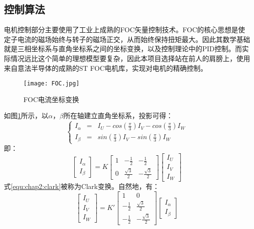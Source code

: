 \subsection{控制算法}
电机控制部分主要使用了工业上成熟的FOC矢量控制技术\cite{FOC}。FOC的核心思想是使定子电流的磁场始终与转子的磁场正交，从而始终保持扭矩最大。因此其数学基础就是三相坐标系与直角坐标系之间的坐标变换，以及控制理论中的PID控制。而实际情况远比这个简单的理想模型要复杂，因此本项目选择站在前人的肩膀上，使用来自意法半导体的成熟的ST FOC电机库\cite{MCSDK}，实现对电机的精确控制。
\begin{figure}[H]
  \centering
  {\texttt{[image: FOC.jpg]}}
  \caption{FOC电流坐标变换\cite{FOC}}
  \label{fig:FOC}
\end{figure}
如图\ref{fig:FOC}所示，以$\alpha$，$\beta$所在轴建立直角坐标系，投影可得：
$$
  \left\{
  \begin{aligned}
  I_\alpha & = &I_U-cos(\frac{\pi}{3})I_V-cos(\frac{\pi}{3})I_W \\
  I_\beta  & = &sin(\frac{\pi}{3})I_V-sin(\frac{\pi}{3})I_W
  \end{aligned}
  \right.
$$
即：
\begin{equation}
  \label{equ:chap2:clark}
  \left[ \begin{array}{c}
  I_\alpha \\
  I_\beta
  \end{array}
  \right]=K\left[ 
    \begin{array}{ccc}
    1 & -\frac{1}{2} & -\frac{1}{2}\\
    0 & \frac{\sqrt{3}}{2} & -\frac{\sqrt{3}}{2}   
    \end{array}
    \right]\left[ \begin{array}{c}
      I_U \\
      I_V \\
      I_W
      \end{array}
      \right]
\end{equation}
式\ref{equ:chap2:clark}被称为Clark变换。自然地，有：
\begin{equation}
  \label{equ:chap2:clark_inv}
  \left[ \begin{array}{c}
    I_U \\
    I_V \\
    I_W
    \end{array}
    \right]=K\prime\left[ 
    \begin{array}{cc}
    1 & 0 \\
    -\frac{1}{2} & \frac{\sqrt{3}}{2} \\
    -\frac{1}{2} & -\frac{\sqrt{3}}{2}   
    \end{array}
    \right]\left[ \begin{array}{c}
      I_\alpha \\
      I_\beta
      \end{array}
      \right]
\end{equation}
